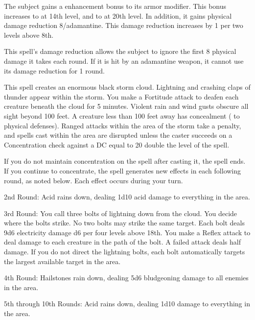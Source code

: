 \spelldur{\durshort}
\begin{spelleffect}
    The subject gains a  enhancement bonus to its armor modifier. This bonus increases to  at 14th level, and to  at 20th level. In addition, it gains physical damage reduction 8/adamantine. This damage reduction increases by 1 per two levels above 8th.
\end{spelleffect}
\begin{spellnotes}
  This spell's damage reduction allows the subject to ignore the first 8 physical damage it takes each round. If it is hit by an adamantine weapon, it cannot use its damage reduction for 1 round.
\end{spellnotes}

\spellrng{\rngfar}
\begin{spelleffect}
  This spell creates an enormous black storm cloud. Lightning and crashing claps of thunder appear within the storm. You make a Fortitude attack to deafen each creature beneath the cloud for 5 minutes. Violent rain and wind gusts obscure all sight beyond 100 feet. A creature less than 100 feet away has concealment ( to physical defenses). Ranged attacks within the area of the storm take a  penalty, and spells cast within the area are disrupted unless the caster succeeds on a Concentration check against a DC equal to 20 \add double the level of the spell.
  \par If you do not maintain concentration on the spell after casting it, the spell ends. If you continue to concentrate, the spell generates new effects in each following round, as noted below. Each effect occurs during your turn.
  \par 2nd Round: Acid rains down, dealing 1d10 acid damage to everything in the area.
  \par 3rd Round: You call three bolts of lightning down from the cloud. You decide where the bolts strike. No two bolts may strike the same target. Each bolt deals 9d6 electricity damage \add d6 per four levels above 18th. You make a Reflex attack to deal damage to each creature in the path of the bolt. A failed attack deals half damage. If you do not direct the lightning bolts, each bolt automatically targets the largest available target in the area.
  \par 4th Round: Hailstones rain down, dealing 5d6 bludgeoning damage to all enemies in the area.
  \par 5th through 10th Rounds: Acid rains down, dealing 1d10 damage to everything in the area.
\end{spelleffect}

